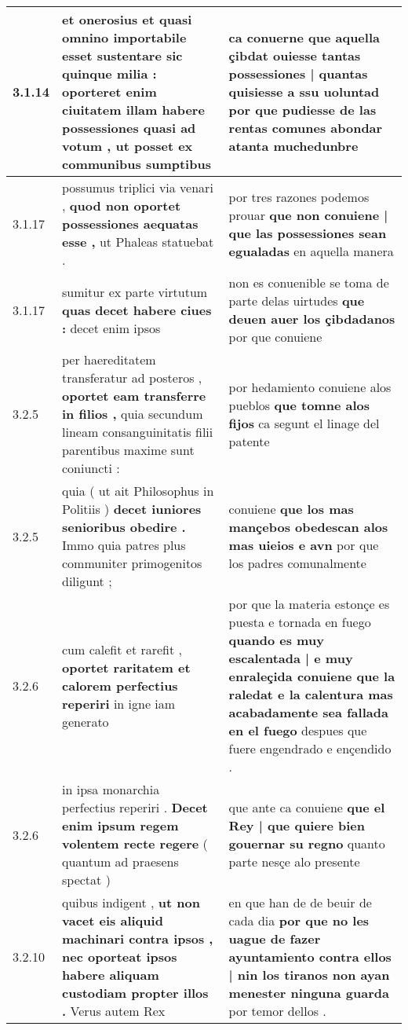 \begin{tabular}{|p{1cm}|p{6.5cm}|p{6.5cm}|}
3.1.14 & et onerosius et quasi omnino importabile esset sustentare sic quinque milia : \textbf{ oporteret enim ciuitatem illam habere possessiones quasi ad votum , } ut posset ex communibus sumptibus & ca conuerne \textbf{ que aquella çibdat ouiesse tantas possessiones | quantas quisiesse a ssu uoluntad } por que pudiesse de las rentas comunes abondar atanta muchedunbre \\\hline
3.1.17 & possumus triplici via venari , \textbf{ quod non oportet possessiones aequatas esse , } ut Phaleas statuebat . & por tres razones podemos prouar \textbf{ que non conuiene | que las possessiones sean egualadas } en aquella manera \\\hline
3.1.17 & sumitur ex parte virtutum \textbf{ quas decet habere ciues : } decet enim ipsos & non es conuenible se toma de parte delas uirtudes \textbf{ que deuen auer los çibdadanos } por que conuiene \\\hline
3.2.5 & per haereditatem transferatur ad posteros , \textbf{ oportet eam transferre in filios , } quia secundum lineam consanguinitatis filii parentibus maxime sunt coniuncti : & por hedamiento conuiene alos pueblos \textbf{ que tomne alos fijos } ca segunt el linage del patente \\\hline
3.2.5 & quia ( ut ait Philosophus in Politiis ) \textbf{ decet iuniores senioribus obedire . } Immo quia patres plus communiter primogenitos diligunt ; & conuiene \textbf{ que los mas mançebos obedescan alos mas uieios e avn } por que los padres comunalmente \\\hline
3.2.6 & cum calefit et rarefit , \textbf{ oportet raritatem et calorem perfectius reperiri } in igne iam generato & por que la materia estonçe es puesta e tornada en fuego \textbf{ quando es muy escalentada | e muy enraleçida conuiene que la raledat e la calentura mas acabadamente sea fallada en el fuego } despues que fuere engendrado e ençendido . \\\hline
3.2.6 & in ipsa monarchia perfectius reperiri . \textbf{ Decet enim ipsum regem volentem recte regere } ( quantum ad praesens spectat ) & que ante ca conuiene \textbf{ que el Rey | que quiere bien gouernar su regno } quanto parte nesçe alo presente \\\hline
3.2.10 & quibus indigent , \textbf{ ut non vacet eis aliquid machinari contra ipsos , nec oporteat ipsos habere aliquam custodiam propter illos . } Verus autem Rex & en que han de de beuir de cada dia \textbf{ por que no les uague de fazer ayuntamiento contra ellos | nin los tiranos non ayan menester ninguna guarda } por temor dellos . \\\hline

\end{tabular}
